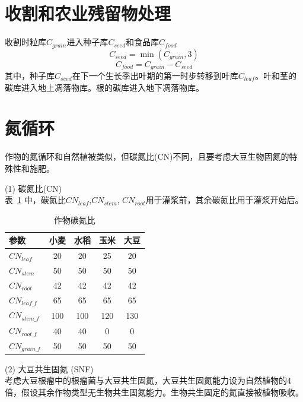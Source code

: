 \section{收割和农业残留物处理}
收割时粒库$C_{grain}$进入种子库$C_{seed}$和食品库$C_{food}$
\begin{equation}
{C}_{ {seed }}=\min \left({C}_{ {grain }}, 3\right)
\end{equation}
\begin{equation}
{C}_{ {food }}={C}_{ {grain }}-{C}_{ {seed }}
\end{equation}
其中，种子库$C_{seed}$在下一个生长季出叶期的第一时步转移到叶库$C_{leaf}$。叶和茎的碳库进入地上凋落物库。根的碳库进入地下凋落物库。


\section{氮循环}
作物的氮循环和自然植被类似，但碳氮比(CN)不同，且要考虑大豆生物固氮的特殊性和施肥。

(1) 碳氮比(CN)\\
表~\ref{tab:作物碳氮比} 中，碳氮比$CN_{leaf}$,$ CN_{stem}$, $CN_{root}$用于灌浆前，其余碳氮比用于灌浆开始后。\\
\begin{table}[htbp]
  \centering
  \caption{作物碳氮比}
  \label{tab:作物碳氮比}
\begin{tabular}{@{}lcccc@{}}
\toprule
参数         & 小麦  & 水稻  & 玉米  & 大豆  \\ \midrule
$CN_{leaf}$     & 20  & 20  & 25  & 20  \\
$CN_{stem}$     & 50  & 50  & 50  & 50  \\
$CN_{root}$     & 42  & 42  & 42  & 42  \\
$CN_{leaf\_f}$  & 65  & 65  & 65  & 65  \\
$CN_{stem\_f}$  & 100 & 100 & 120 & 130 \\
$CN_{root\_f}$  & 40  & 40  & 0   & 0   \\
$CN_{grain\_f}$ & 50  & 50  & 50  & 50  \\ \bottomrule
\end{tabular}
\end{table}

(2) 大豆共生固氮 (SNF)\\
考虑大豆根瘤中的根瘤菌与大豆共生固氮，大豆共生固氮能力设为自然植物的4倍，假设其余作物类型无生物共生固氮能力。生物共生固定的氮直接被植物吸收。\\

